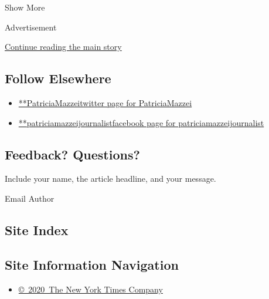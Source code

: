 Show More

Advertisement

\protect\hyperlink{after-mid2}{Continue reading the main story}

\hypertarget{follow-elsewhere}{%
\subsection{Follow Elsewhere}\label{follow-elsewhere}}

\begin{itemize}
\tightlist
\item
  \href{https://twitter.com/PatriciaMazzei}{**PatriciaMazzeitwitter page
  for PatriciaMazzei}
\item
  \href{https://www.facebook.com/patriciamazzeijournalist}{**patriciamazzeijournalistfacebook
  page for patriciamazzeijournalist}
\end{itemize}

\hypertarget{feedback-questions}{%
\subsection{Feedback? Questions?}\label{feedback-questions}}

Include your name, the article headline, and your message.

Email Author

\hypertarget{site-index}{%
\subsection{Site Index}\label{site-index}}

\hypertarget{site-information-navigation}{%
\subsection{Site Information
Navigation}\label{site-information-navigation}}

\begin{itemize}
\tightlist
\item
  \href{https://help.nytimes.com/hc/en-us/articles/115014792127-Copyright-notice}{©~2020~The
  New York Times Company}
\end{itemize}


